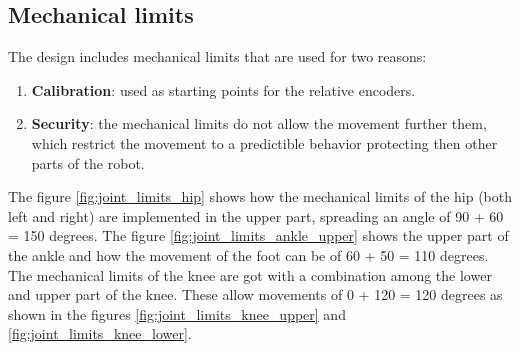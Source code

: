 \subsection{Mechanical limits} %
\label{sub:mechanical_limits}
The design includes mechanical limits that are used for two reasons:
\begin{enumerate}
  \item \textbf{Calibration}: used as starting points for the relative encoders.
  \item \textbf{Security}: the mechanical limits do not allow the movement further them, which restrict the movement to a predictible behavior protecting then other parts of the robot.
\end{enumerate}

The figure \ref{fig:joint_limits_hip} shows how the mechanical limits of the hip (both left and right) are implemented in the upper part, spreading an angle of 90 + 60 = 150 degrees.
The figure \ref{fig:joint_limits_ankle_upper} shows the upper part of the ankle and how the movement of the foot can be of 60 + 50 = 110 degrees.
The mechanical limits of the knee are got with a combination among the lower and upper part of the knee.
These allow movements of 0 + 120 = 120 degrees as shown in the figures \ref{fig:joint_limits_knee_upper} and \ref{fig:joint_limits_knee_lower}.

